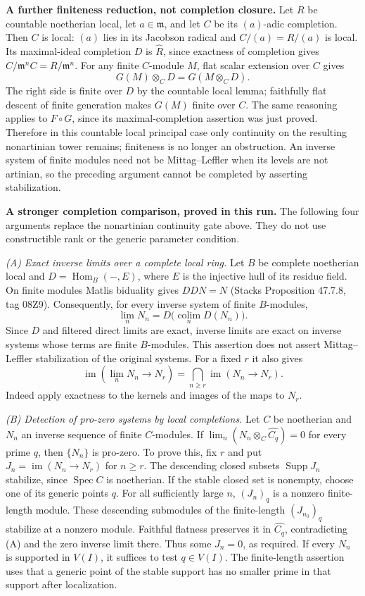 \textbf{A further finiteness reduction, not completion closure.}
Let $R$ be countable noetherian local, let $a\in\mathfrak m$,
and let $C$ be its $(a)$-adic completion. Then $C$ is local:
$(a)$ lies in its Jacobson radical and $C/(a)=R/(a)$ is local.
Its maximal-ideal completion $D$ is $\widehat R$, since exactness
of completion gives $C/\mathfrak m^nC=R/\mathfrak m^n$.
For any finite $C$-module $M$, flat scalar extension over $C$
gives
\[
 G(M)\otimes_C D=G(M\otimes_C D).
\]
The right side is finite over $D$ by the countable local lemma;
faithfully flat descent of finite generation makes $G(M)$ finite
over $C$. The same reasoning applies to $F\circ G$, since its
maximal-completion assertion was just proved. Therefore in this
countable local principal case only continuity on the resulting
nonartinian tower remains; finiteness is no longer an obstruction.
An inverse system of finite modules need not be Mittag--Leffler
when its levels are not artinian, so the preceding argument cannot
be completed by asserting stabilization.


\textbf{A stronger completion comparison, proved in this run.}
The following four arguments replace the nonartinian continuity gate above.
They do not use constructible rank or the generic parameter condition.

\emph{(A) Exact inverse limits over a complete local ring.}
Let $B$ be complete noetherian local and $D=\operatorname{Hom}_B(-,E)$,
where $E$ is the injective hull of its residue field. On finite modules
Matlis biduality gives $DDN=N$ (Stacks Proposition 47.7.8, tag 08Z9).
Consequently, for every inverse system of finite $B$-modules,
\[
 \lim_n N_n=D\bigl(\operatorname*{colim}_n D(N_n)\bigr).
\]
Since $D$ and filtered direct limits are exact, inverse limits are exact
on inverse systems whose terms are finite $B$-modules. This assertion
does not assert Mittag--Leffler stabilization of the original systems.
For a fixed $r$ it also gives
\[
 \operatorname{im}(\lim_n N_n\longrightarrow N_r)
 =\bigcap_{n\geq r}\operatorname{im}(N_n\longrightarrow N_r).
\]
Indeed apply exactness to the kernels and images of the maps to $N_r$.

\emph{(B) Detection of pro-zero systems by local completions.}
Let $C$ be noetherian and $N_n$ an inverse sequence of finite
$C$-modules. If $\lim_n(N_n\otimes_C\widehat{C_q})=0$ for every
prime $q$, then $\{N_n\}$ is pro-zero. To prove this, fix $r$ and put
$J_n=\operatorname{im}(N_n\to N_r)$ for $n\geq r$. The descending
closed subsets $\operatorname{Supp}J_n$ stabilize, since
$\operatorname{Spec}C$ is noetherian. If the stable closed set is
nonempty, choose one of its generic points $q$. For all sufficiently
large $n$, $(J_n)_q$ is a nonzero finite-length module. These descending
submodules of the finite-length $(J_{n_0})_q$ stabilize at a nonzero
module. Faithful flatness preserves it in $\widehat{C_q}$, contradicting
(A) and the zero inverse limit there. Thus some $J_n=0$, as required.
If every $N_n$ is supported in $V(I)$, it suffices to test $q\in V(I)$.
The finite-length assertion uses that a generic point of the stable
support has no smaller prime in that support after localization.

